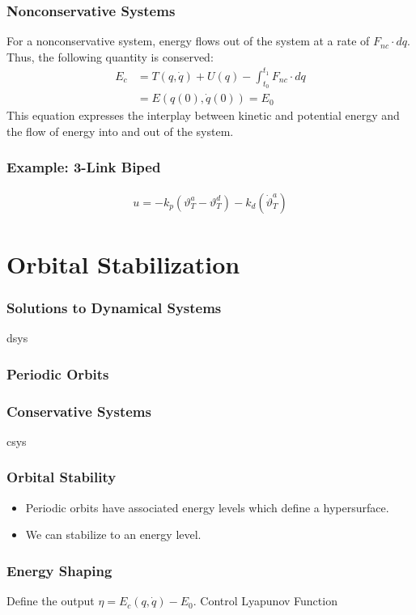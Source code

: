 \documentclass{beamer}
\newcommand{\nc}{\mathit{nc}}
\begin{document}
\begin{frame}
  \frametitle{Nonconservative Systems}
  For a nonconservative system, energy flows out of the system at a rate of $F_{\nc} \cdot dq$. Thus, the following quantity is conserved:
  \begin{align*}
    E_{c} &= T(q, \dot q) + U(q) - \int_{t_{0}}^{t_{1}} \! F_{\nc} \cdot dq\\
    &= E(q(0), \dot q(0)) = E_{0}
  \end{align*}
  This equation expresses the interplay between kinetic and potential energy and the flow of energy into and out of the system.
\end{frame}

\begin{frame}
  \frametitle{Example: 3-Link Biped}
  \begin{align*}
    u = -k_{p} (\vartheta_{T}^{a} - \vartheta_{T}^{d}) - k_{d} (\dot \vartheta_{T}^{a})
  \end{align*}
\end{frame}

\section{Orbital Stabilization}
\begin{frame}
  \frametitle{Solutions to Dynamical Systems}
  dsys
\end{frame}

\begin{frame}
  \frametitle{Periodic Orbits}
\end{frame}

\begin{frame}
  \frametitle{Conservative Systems}
  csys
\end{frame}

\begin{frame}
  \frametitle{Orbital Stability}
  \begin{itemize}
  \item Periodic orbits have associated energy levels which define a hypersurface.
  \item We can stabilize to an energy level.
  \end{itemize}
\end{frame}


\begin{frame}
  \frametitle{Energy Shaping}
  Define the output $\eta = E_{c}(q, \dot q) - E_{0}$.
  Control Lyapunov Function
\end{frame}
\end{document}
